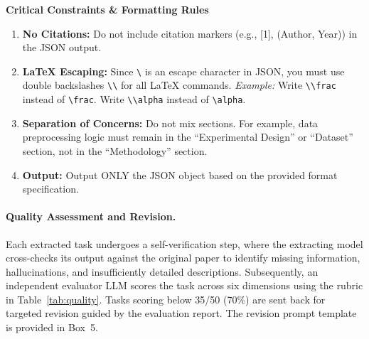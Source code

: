 \begin{tcolorbox}
\smallskip
\textbf{Critical Constraints \& Formatting Rules}
\begin{enumerate}[nosep,leftmargin=12pt]
	\item \textbf{No Citations:} Do not include citation markers (e.g., [1], (Author, Year)) in the JSON output.
	\item \textbf{LaTeX Escaping:} Since \texttt{\textbackslash} is an escape character in JSON, you must use double backslashes \texttt{\textbackslash\textbackslash} for all LaTeX commands. \textit{Example:} Write \texttt{\textbackslash\textbackslash frac} instead of \texttt{\textbackslash frac}. Write \texttt{\textbackslash\textbackslash alpha} instead of \texttt{\textbackslash alpha}.
	\item \textbf{Separation of Concerns:} Do not mix sections. For example, data preprocessing logic must remain in the ``Experimental Design'' or ``Dataset'' section, not in the ``Methodology'' section.
	\item \textbf{Output:} Output ONLY the JSON object based on the provided format specification.
\end{enumerate}
\end{tcolorbox}

\paragraph{Quality Assessment and Revision.}
Each extracted task undergoes a self-verification step, where the extracting model cross-checks its output against the original paper to identify missing information, hallucinations, and insufficiently detailed descriptions. Subsequently, an independent evaluator LLM scores the task across six dimensions using the rubric in Table~\ref{tab:quality}. Tasks scoring below 35/50 (70\%) are sent back for targeted revision guided by the evaluation report. The revision prompt template is provided in Box~5.

